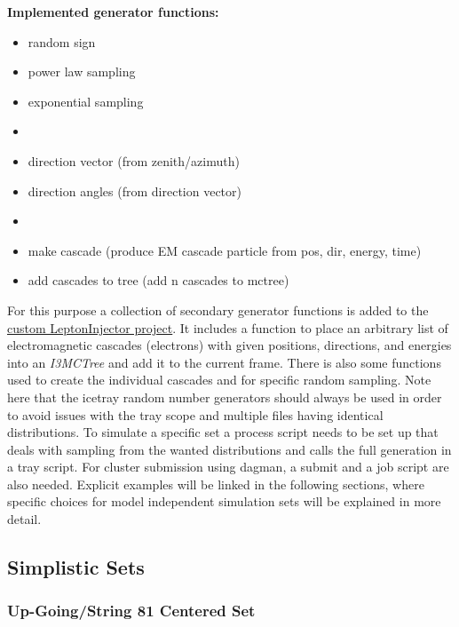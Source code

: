 \textbf{Implemented generator functions:}
\begin{itemize}
    \item random sign 
    \item power law sampling
    \item exponential sampling
    \item[] 
    \item direction vector (from zenith/azimuth)
    \item direction angles (from direction vector)
    \item[] 
    \item make cascade (produce EM cascade particle from pos, dir, energy, time)
    \item add cascades to tree (add n cascades to mctree)
\end{itemize}



For this purpose a collection of secondary generator functions is added to the \href{https://github.com/LeanderFischer/LeptonInjector-HNL/blob/main/LeptonInjector/python/cascade_generator_functions.py}{custom LeptonInjector project}. It includes a function to place an arbitrary list of electromagnetic cascades (electrons) with given positions, directions, and energies into an \textit{I3MCTree} and add it to the current frame. There is also some functions used to create the individual cascades and for specific random sampling. Note here that the icetray random number generators should always be used in order to avoid issues with the tray scope and multiple files having identical distributions. To simulate a specific set a process script needs to be set up that deals with sampling from the wanted distributions and calls the full generation in a tray script. For cluster submission using dagman, a submit and a job script are also needed. Explicit examples will be linked in the following sections, where specific choices for model independent simulation sets will be explained in more detail.

\subsection{Simplistic Sets}


\subsubsection{Up-Going/String 81 Centered Set}


